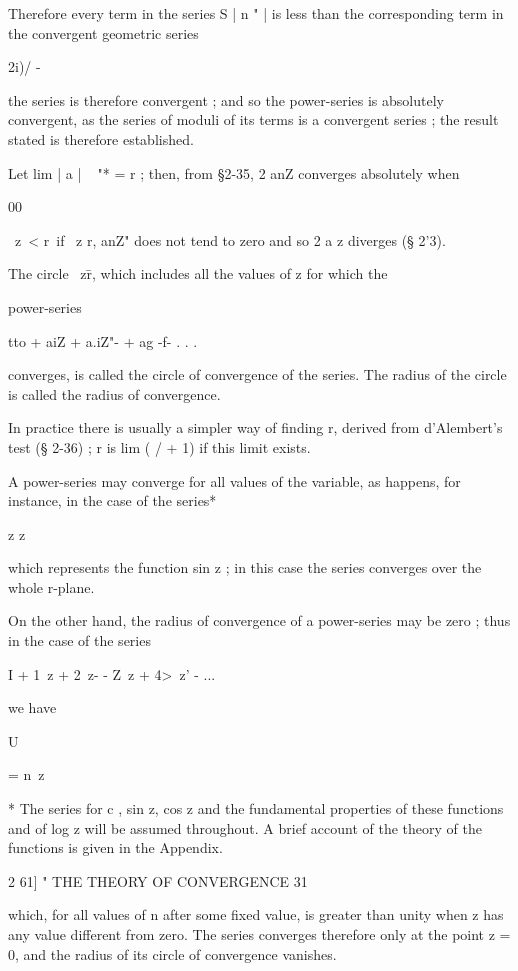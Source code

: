 Therefore every term in the series S |  n " | is less than the corresponding 
term in the convergent geometric series 

2i)/ - 

the series is therefore convergent ; and so the power-series is absolutely 
convergent, as the series of moduli of its terms is a convergent series ; 
the result stated is therefore established. 

Let lim | a  | ~ "* = r ; then, from §2-35, 2 anZ  converges absolutely when 

00 

\ z\ < r\ if \ z r, anZ" does not tend to zero and so 2 a z  diverges (§ 2'3). 

The circle \ z\=r, which includes all the values of z for which the 

power-series 

tto + aiZ + a.iZ"- + ag  -f- . . . 

converges, is called the circle of convergence of the series. The radius of 
the circle is called the radius of convergence. 

In practice there is usually a simpler way of finding r, derived from d'Alembert's 
test (§ 2-36) ; r is lim (  /   + 1) if this limit exists. 

A power-series may converge for all values of the variable, as happens, for 
instance, in the case of the series* 

z  z  

which represents the function sin z ; in this case the series converges over the 
whole  r-plane. 

On the other hand, the radius of convergence of a power-series may be 
zero ; thus in the case of the series 

I + 1\ z + 2\ z- - Z\ z  + 4>\ z' -  ... 



we have 



U  



= n\ z 



* The series for c , sin z, cos z and the fundamental properties of these functions and of 
log z will be assumed throughout. A brief account of the theory of the functions is given 
in the Appendix. 



2 61] " THE THEORY OF CONVERGENCE 31 

which, for all values of n after some fixed value, is greater than unity when 
z has any value different from zero. The series converges therefore only at 
the point z = 0, and the radius of its circle of convergence vanishes. 

